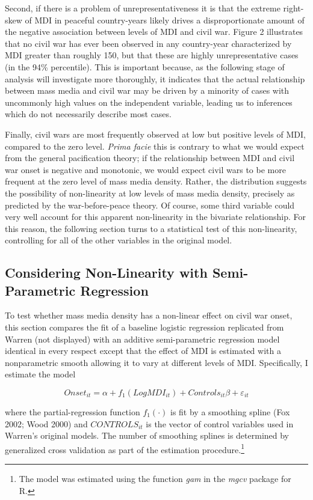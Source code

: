 \documentclass[11pt,article,oneside]{memoir}
\begin{document}
Second, if there is a problem of unrepresentativeness it is that the
extreme right-skew of MDI in peaceful country-years likely drives a
disproportionate amount of the negative association between levels of
MDI and civil war. Figure 2 illustrates that no civil war has ever been
observed in any country-year characterized by MDI greater than roughly
150, but that these are highly unrepresentative cases (in the 94\%
percentile). This is important because, as the following stage of
analysis will investigate more thoroughly, it indicates that the actual
relationship between mass media and civil war may be driven by a
minority of cases with uncommonly high values on the independent
variable, leading us to inferences which do not necessarily describe
most cases.

Finally, civil wars are most frequently observed at low but positive
levels of MDI, compared to the zero level. \emph{Prima facie} this is
contrary to what we would expect from the general pacification theory;
if the relationship between MDI and civil war onset is negative and
monotonic, we would expect civil wars to be more frequent at the zero
level of mass media density. Rather, the distribution suggests the
possibility of non-linearity at low levels of mass media density,
precisely as predicted by the war-before-peace theory. Of course, some
third variable could very well account for this apparent non-linearity
in the bivariate relationship. For this reason, the following section
turns to a statistical test of this non-linearity, controlling for all
of the other variables in the original model.

\subsection{Considering Non-Linearity with Semi-Parametric
Regression}\label{considering-non-linearity-with-semi-parametric-regression}

To test whether mass media density has a non-linear effect on civil war
onset, this section compares the fit of a baseline logistic regression
replicated from Warren (not displayed) with an additive semi-parametric
regression model identical in every respect except that the effect of
MDI is estimated with a nonparametric smooth allowing it to vary at
different levels of MDI. Specifically, I estimate the model

\[ Onset_{it} = \alpha + f_1 (LogMDI_{it}) + Controls_{it} \beta  + \varepsilon_{it} \]

where the partial-regression function $f_1 (\cdot)$ is fit by a
smoothing spline (Fox 2002; Wood 2000) and $CONTROLS_{it}$ is the vector
of control variables used in Warren's original models. The number of
smoothing splines is determined by generalized cross validation as part
of the estimation procedure.\footnote{The model was estimated using the
  function \emph{gam} in the \emph{mgcv} package for R.}
\end{document}
